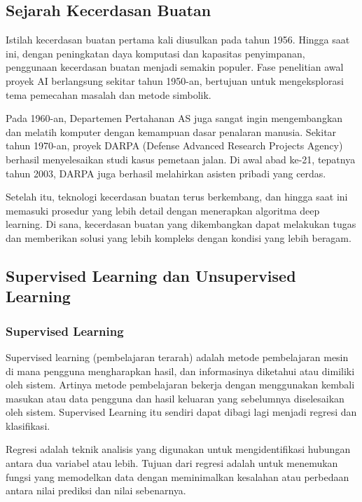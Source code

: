 \subsection{Sejarah Kecerdasan Buatan}

\par Istilah kecerdasan buatan pertama kali diusulkan pada tahun 1956. Hingga saat ini, dengan peningkatan daya komputasi dan kapasitas penyimpanan, penggunaan kecerdasan buatan menjadi semakin populer. Fase penelitian awal proyek AI berlangsung sekitar tahun 1950-an, bertujuan untuk mengeksplorasi tema pemecahan masalah dan metode simbolik.

\par Pada 1960-an, Departemen Pertahanan AS juga sangat ingin mengembangkan dan melatih komputer dengan kemampuan dasar penalaran manusia. Sekitar tahun 1970-an, proyek DARPA (Defense Advanced Research Projects Agency) berhasil menyelesaikan studi kasus pemetaan jalan. Di awal abad ke-21, tepatnya tahun 2003, DARPA juga berhasil melahirkan asisten pribadi yang cerdas.

\par Setelah itu, teknologi kecerdasan buatan terus berkembang, dan hingga saat ini memasuki prosedur yang lebih detail dengan menerapkan algoritma deep learning. Di sana, kecerdasan buatan yang dikembangkan dapat melakukan tugas dan memberikan solusi yang lebih kompleks dengan kondisi yang lebih beragam.\cite{sejarahai}

\subsection{Supervised Learning dan Unsupervised Learning}

\subsubsection{Supervised Learning}

\par Supervised learning (pembelajaran terarah) adalah metode pembelajaran mesin di mana pengguna mengharapkan hasil, dan informasinya diketahui atau dimiliki oleh sistem. Artinya metode pembelajaran bekerja dengan menggunakan kembali masukan atau data pengguna dan hasil keluaran yang sebelumnya diselesaikan oleh sistem. Supervised Learning itu sendiri dapat dibagi lagi menjadi regresi dan klasifikasi.\cite{mahardhika2018analisis}

\par Regresi adalah teknik analisis yang digunakan untuk mengidentifikasi hubungan antara dua variabel atau lebih. Tujuan dari regresi adalah untuk menemukan fungsi yang memodelkan data dengan meminimalkan kesalahan atau perbedaan antara nilai prediksi dan nilai sebenarnya.

